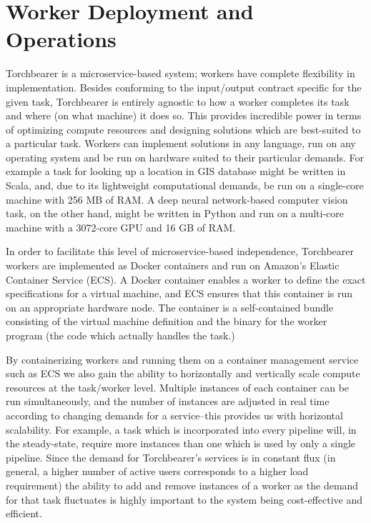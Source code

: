 \section{Worker Deployment and Operations}
Torchbearer is a microservice-based system; workers have complete flexibility in implementation. Besides conforming to the input/output contract specific for the given task, Torchbearer is entirely agnostic to how a worker completes its task and where (on what machine) it does so. This provides incredible power in terms of optimizing compute resources and designing solutions which are best-suited to a particular task. Workers can implement solutions in any language, run on any operating system and be run on hardware suited to their particular demands. For example a task for looking up a location in GIS database might be written in Scala, and, due to its lightweight computational demands, be run on a single-core machine with 256 MB of RAM. A deep neural network-based computer vision task, on the other hand, might be written in Python and run on a multi-core machine with a 3072-core GPU and 16 GB of RAM.

In order to facilitate this level of microservice-based independence, Torchbearer workers are implemented as Docker containers and run on Amazon’s Elastic Container Service (ECS). A Docker container enables a worker to define the exact specifications for a virtual machine, and ECS ensures that this container is run on an appropriate hardware node. The container is a self-contained bundle consisting of the virtual machine definition and the binary for the worker program (the code which actually handles the task.) 

By containerizing workers and running them on a container management service such as ECS we also gain the ability to horizontally and vertically scale compute resources at the task/worker level. Multiple instances of each container can be run simultaneously, and the number of instances are adjusted in real time according to changing demands for a service--this provides us with horizontal scalability. For example, a task which is incorporated into every pipeline will, in the steady-state, require more instances than one which is used by only a single pipeline. Since the demand for Torchbearer’s services is in constant flux (in general, a higher number of active users corresponds to a higher load requirement) the ability to add and remove instances of a worker as the demand for that task fluctuates is highly important to the system being cost-effective and efficient.

